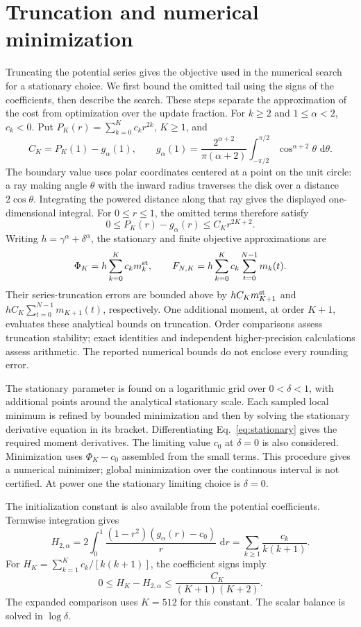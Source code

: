 \documentclass[11pt,a4paper]{article}
\newcommand{\dd}{\,\mathrm d}
\begin{document}
\section{Truncation and numerical minimization}
Truncating the potential series gives the objective used in the numerical search for a stationary choice. We first bound the omitted tail using the signs of the coefficients, then describe the search. These steps separate the approximation of the cost from optimization over the update fraction. For $k\geq2$ and $1\leq\alpha<2$, $c_k<0$. Put $P_K(r)=\sum_{k=0}^{K}c_kr^{2k}$, $K\geq1$, and
\[
C_K=P_K(1)-g_\alpha(1),\qquad
g_\alpha(1)=\frac{2^{\alpha+2}}{\pi(\alpha+2)}
\int_{-\pi/2}^{\pi/2}\cos^{\alpha+2}\theta\,\dd\theta.
\]
The boundary value uses polar coordinates centered at a point on the unit circle: a ray making angle $\theta$ with the inward radius traverses the disk over a distance $2\cos\theta$. Integrating the powered distance along that ray gives the displayed one-dimensional integral. For $0\leq r\leq1$, the omitted terms therefore satisfy
\[
0\leq P_K(r)-g_\alpha(r)\leq C_Kr^{2K+2}.
\]
Writing $h=\gamma^\alpha+\delta^\alpha$, the stationary and finite objective approximations are
\[
\Phi_K=h\sum_{k=0}^{K}c_km_k^{\rm st},\qquad
F_{N,K}=h\sum_{k=0}^{K}c_k\sum_{t=0}^{N-1}m_k(t).
\]
Their series-truncation errors are bounded above by $hC_Km_{K+1}^{\rm st}$ and $hC_K\sum_{t=0}^{N-1}m_{K+1}(t)$, respectively. One additional moment, at order $K+1$, evaluates these analytical bounds on truncation. Order comparisons assess truncation stability; exact identities and independent higher-precision calculations assess arithmetic. The reported numerical bounds do not enclose every rounding error.

The stationary parameter is found on a logarithmic grid over $0<\delta<1$, with additional points around the analytical stationary scale. Each sampled local minimum is refined by bounded minimization and then by solving the stationary derivative equation in its bracket. Differentiating Eq.~\eqref{eq:stationary} gives the required moment derivatives. The limiting value $c_0$ at $\delta=0$ is also considered. Minimization uses $\Phi_K-c_0$ assembled from the small terms. This procedure gives a numerical minimizer; global minimization over the continuous interval is not certified. At power one the stationary limiting choice is $\delta=0$.

The initialization constant is also available from the potential coefficients. Termwise integration gives
\[
H_{2,\alpha}=2\int_0^1\frac{(1-r^2)(g_\alpha(r)-c_0)}{r}\,\dd r
=\sum_{k\geq1}\frac{c_k}{k(k+1)}.
\]
For $H_K=\sum_{k=1}^{K}c_k/[k(k+1)]$, the coefficient signs imply
\[
0\leq H_K-H_{2,\alpha}\leq \frac{C_K}{(K+1)(K+2)}.
\]
The expanded comparison uses $K=512$ for this constant. The scalar balance is solved in $\log\delta$.
\end{document}
